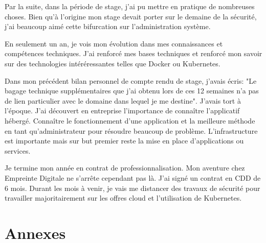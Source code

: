 \documentclass[12pt, a4paper, twoside]{article}
\begin{document}
Par la suite, dans la période de stage, j'ai pu mettre en pratique de nombreuses choses.
Bien qu'à l'origine mon stage devait porter sur le demaine de la sécurité, j'ai beaucoup aimé cette bifurcation sur l'administration système.


En seulement un an, je vois mon évolution dans mes connaissances et compétences techniques.
J'ai renforcé mes bases techniques et renforcé mon savoir sur des technologies intéréressantes telles que Docker ou Kubernetes.


Dans mon précédent bilan personnel de compte rendu de stage, j'avais écris: "Le bagage technique supplémentaires que j'ai obtenu lors de ces 12 semaines n'a pas de lien particulier avec le domaine dans lequel je me destine".
J'avais tort à l'époque.
J'ai découvert en entreprise l'importance de connaître l'applicatif hébergé.
Connaître le fonctionnement d'une application et la meilleure méthode en tant qu'administrateur pour résoudre beaucoup de problème.
L'infrastructure est importante mais sur but premier reste la mise en place d'applications ou services.

Je termine mon année en contrat de professionnalisation.
Mon aventure chez Empreinte Digitale ne s'arrête cependant pas là.
J'ai signé un contrat en CDD de 6 mois.
Durant les mois à venir, je vais me distancer des travaux de sécurité pour travailler majoritairement sur les offres cloud et l'utilisation de Kubernetes.

\newpage
\section*{Annexes}
\end{document}

